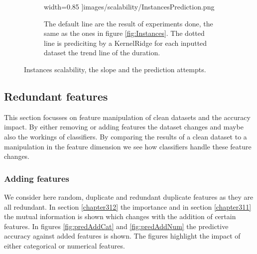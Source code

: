 \documentclass[a4paper,10pt]{article}
\begin{document}
\begin{figure}[H]
\begin{subfigure}[b]{0.65\textwidth}
	width=0.85\textwidth
	]{images/scalability/InstancesPrediction.png}
	\caption{The default line are the result of experiments done, the same as the ones in figure \ref{fig:Instances}. The dotted line is prediciting by a KernelRidge for each inputted dataset the trend line of the duration. }
	\label{fig:InstancesPred}
\end{subfigure}
	
	\caption{Instances scalability, the slope and the prediction attempts.}
	\label{fig:Inst}
\end{figure}

 

\newpage
\subsection{Redundant features}
This section focusses on feature manipulation of clean datasets and the accuracy impact. By either removing or adding features the dataset changes and maybe also the workings of classifiers. By comparing the results of a clean dataset to a manipulation in the feature dimension we see how classifiers handle these feature changes.

\subsubsection{Adding features}
We consider here random, duplicate and redundant duplicate features as they are all redundant. In section \ref{chapter312} the importance and in section \ref{chapter311} the mutual information is shown which changes with the addition of certain features. In figures \ref{fig:predAddCat} and \ref{fig:predAddNum} the predictive accuracy against added features is shown. The figures highlight the impact of either categorical or numerical features.   \\
\end{document}
